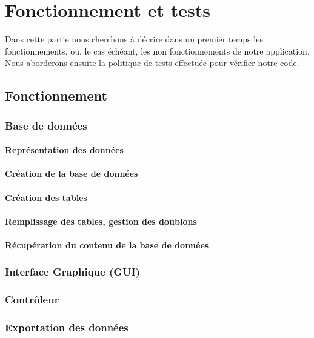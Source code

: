 \chapter{Fonctionnement et tests}

Dans cette partie nous cherchons à décrire dans un premier temps les fonctionnements, ou, le cas échéant, les non fonctionnements de notre application.  Nous aborderons ensuite la politique de tests effectuée pour vérifier notre code. 

\section{Fonctionnement}



\subsection{Base de données}

\subsubsection{Représentation des données}
\lipsum[1]

\subsubsection{Création de la base de données}
\lipsum[2]

\subsubsection{Création des tables}
\lipsum[3]

\subsubsection{Remplissage des tables, gestion des doublons}
\lipsum[4]

\subsubsection{Récupération du contenu de la base de données}
\lipsum[5]


\subsection{Interface Graphique (GUI)}
\lipsum[6]


\subsection{Contrôleur}
\lipsum[7]


\subsection{Exportation des données}
\lipsum[8]